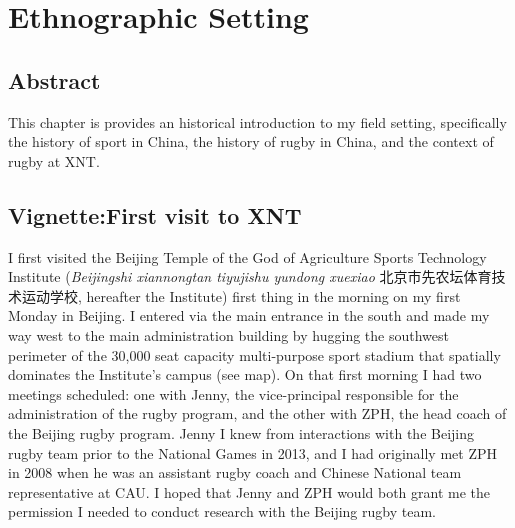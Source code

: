 \chapter{\label{ethnographicSetting}Ethnographic Setting}

\section{Abstract}

This chapter is provides an historical introduction to my field setting, specifically the history of sport in China, the history of rugby in China, and the context of rugby at XNT.


\section{Vignette:First visit to XNT}
I first visited the Beijing Temple of the God of Agriculture Sports Technology Institute (\textit{Beijingshi xiannongtan tiyujishu yundong xuexiao} 北京市先农坛体育技术运动学校,
hereafter the Institute) first thing in the morning on my first Monday in Beijing. I entered via the main entrance in the south and made my way west to the main administration building by hugging the southwest perimeter of the 30,000 seat capacity multi-purpose sport stadium that spatially dominates the Institute's campus (see map).  On that first morning I had two meetings scheduled: one with Jenny, the vice-principal responsible for the administration of the rugby program, and the other with ZPH, the head coach of the Beijing rugby program.  Jenny I knew from interactions with the Beijing rugby team prior to the National Games in 2013, and I had originally met ZPH in 2008 when he was an assistant rugby coach and Chinese National team representative at CAU.  I hoped that Jenny and ZPH would both grant me the permission I needed to conduct research with the Beijing rugby team.

